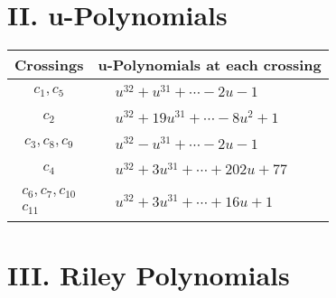 \documentclass[1p]{elsarticle_modified}
\theoremstyle{definition}
\begin{document}
\newpage\renewcommand{\arraystretch}{1}
\centering \section*{ II. u-Polynomials}
\begin{tabular}{m{50pt}|m{274pt}}
Crossings & \hspace{64pt}u-Polynomials at each crossing \\
\hline $$\begin{aligned}c_{1},c_{5}\end{aligned}$$&$\begin{aligned}
&u^{32}+u^{31}+\cdots-2 u-1
\end{aligned}$\\
\hline $$\begin{aligned}c_{2}\end{aligned}$$&$\begin{aligned}
&u^{32}+19 u^{31}+\cdots-8 u^2+1
\end{aligned}$\\
\hline $$\begin{aligned}c_{3},c_{8},c_{9}\end{aligned}$$&$\begin{aligned}
&u^{32}- u^{31}+\cdots-2 u-1
\end{aligned}$\\
\hline $$\begin{aligned}c_{4}\end{aligned}$$&$\begin{aligned}
&u^{32}+3 u^{31}+\cdots+202 u+77
\end{aligned}$\\
\hline $$\begin{aligned}c_{6},c_{7},c_{10}\\c_{11}\end{aligned}$$&$\begin{aligned}
&u^{32}+3 u^{31}+\cdots+16 u+1
\end{aligned}$\\
\hline
\end{tabular}\newpage\renewcommand{\arraystretch}{1}
\centering \section*{ III. Riley Polynomials}
\end{document}
